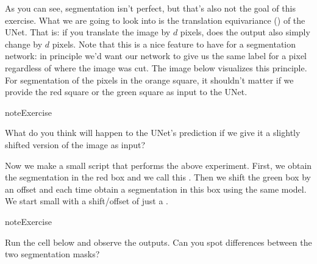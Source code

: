 \documentclass[letterpaper,10pt,english]{jupyterBook}
\begin{document}
\sphinxAtStartPar
As you can see, segmentation isn’t perfect, but that’s also not the goal of this exercise. What we are going to look into is the translation equivariance () of the U\sphinxhyphen{}Net. That is: if you translate the image by \(d\) pixels, does the output also simply change by \(d\) pixels. Note that this is a nice feature to have for a segmentation network: in principle we’d want our network to give us the same label for a pixel regardless of where the image was cut. The image below visualizes this principle. For segmentation of the pixels in the orange square, it shouldn’t matter if we provide the red square or the green square as input to the U\sphinxhyphen{}Net.

\sphinxAtStartPar


\begin{sphinxadmonition}{note}{Exercise}

\sphinxAtStartPar
What do you think will happen to the U\sphinxhyphen{}Net’s prediction if we give it a slightly shifted version of the image as input?
\end{sphinxadmonition}

\sphinxAtStartPar
Now we make a small script that performs the above experiment. First, we obtain the segmentation in the red box and we call this . Then we shift the green box by an offset and each time obtain a segmentation in this box using the same model. We start small with a shift/offset of just a .

\begin{sphinxadmonition}{note}{Exercise}

\sphinxAtStartPar
Run the cell below and observe the outputs. Can you spot differences between the two segmentation masks?
\end{sphinxadmonition}
\end{document}
